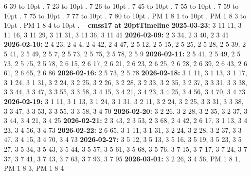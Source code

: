 \smallskip
{} 6 39 \leaders\hbox to 10pt {\hss.\hss}  \hfill {}
\smallskip
{} 7 23 \leaders\hbox to 10pt {\hss.\hss}  \hfill {}
\smallskip
{} 7 26 \leaders\hbox to 10pt {\hss.\hss}  \hfill {}
\smallskip
{} 7 45 \leaders\hbox to 10pt {\hss.\hss}  \hfill {}
\smallskip
{} 7 55 \leaders\hbox to 10pt {\hss.\hss}  \hfill {}
\smallskip
{} 7 59 \leaders\hbox to 10pt {\hss.\hss}  \hfill {}
\smallskip
{} 7 75 \leaders\hbox to 10pt {\hss.\hss}  \hfill {}
\smallskip
{} 7 77 \leaders\hbox to 10pt {\hss.\hss}  \hfill {}
\smallskip
{} 7 80 \leaders\hbox to 10pt {\hss.\hss}  \hfill {}
\smallskip
\noindent PM 1 8 1 \leaders\hbox to 10pt {\hss.\hss}  \hfill {}
\smallskip
\noindent PM 1 8 3 \leaders\hbox to 10pt {\hss.\hss}  \hfill {}
\smallskip
\noindent PM 1 8 4 \leaders\hbox to 10pt {\hss.\hss}  \hfill {}
\smallskip
\vfill \break
{\medskip\noindent\bf\font\titlefont=cmss17 at 20pt\titlefont Timeline}\medskip
{\noindent \bf 2025-03-23:} 3 11 11, 3 11 16, 3 11 29, 3 11 31, 3 11 36, 3 11 41\smallskip
{\noindent \bf 2026-02-09:} 2 3 34, 2 3 40, 2 3 41\smallskip
{\noindent \bf 2026-02-10:} 2 4 23, 2 4 4, 2 4 42, 2 4 47, 2 5 12, 2 5 15, 2 5 25, 2 5 28, 2 5 39, 2 5 41, 2 5 49, 2 5 7, 2 5 73, 2 5 75, 2 5 78, 2 5 9\smallskip
{\noindent \bf 2026-02-11:} 2 5 41, 2 5 49, 2 5 73, 2 5 75, 2 5 78, 2 6 15, 2 6 17, 2 6 21, 2 6 23, 2 6 25, 2 6 28, 2 6 39, 2 6 43, 2 6 61, 2 6 65, 2 6 86\smallskip
{\noindent \bf 2026-02-16:} 2 5 73, 2 5 78\smallskip
{\noindent \bf 2026-02-18:} 3 1 11, 3 1 13, 3 1 17, 3 1 24, 3 1 31, 3 2 24, 3 2 25, 3 2 26, 3 2 28, 3 2 33, 3 2 35, 3 2 37, 3 3 31, 3 3 38, 3 3 44, 3 3 47, 3 3 55, 3 3 58, 3 4 15, 3 4 21, 3 4 23, 3 4 25, 3 4 56, 3 4 70, 3 4 73\smallskip
{\noindent \bf 2026-02-19:} 3 1 11, 3 1 13, 3 1 24, 3 1 31, 3 2 11, 3 2 24, 3 2 25, 3 3 31, 3 3 38, 3 3 47, 3 3 53, 3 3 55, 3 3 58, 3 4 70\smallskip
{\noindent \bf 2026-02-20:} 3 2 26, 3 2 28, 3 2 35, 3 2 37, 3 3 44, 3 4 21, 3 4 25\smallskip
{\noindent \bf 2026-02-21:} 2 3 43, 2 3 53, 2 3 68, 2 4 42, 2 6 17, 3 1 13, 3 4 23, 3 4 56, 3 4 73\smallskip
{\noindent \bf 2026-02-22:} 2 6 65, 3 1 11, 3 1 31, 3 2 24, 3 2 28, 3 2 37, 3 3 47, 3 4 15, 3 4 70, 3 4 73\smallskip
{\noindent \bf 2026-02-27:} 3 5 12, 3 5 13, 3 5 16, 3 5 19, 3 5 23, 3 5 27, 3 5 34, 3 5 43, 3 5 44, 3 5 57, 3 5 61, 3 5 68, 3 5 76, 3 7 15, 3 7 17, 3 7 24, 3 7 37, 3 7 41, 3 7 43, 3 7 63, 3 7 93, 3 7 95\smallskip
{\noindent \bf 2026-03-01:} 3 2 26, 3 4 56, PM 1 8 1, PM 1 8 3, PM 1 8 4\smallskip
